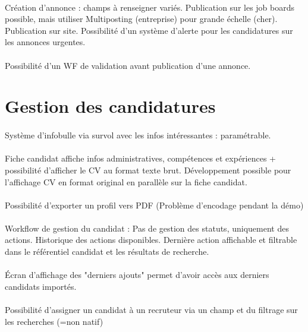 \paragraph{} Création d'annonce : champs à renseigner variés. Publication sur les job boards possible, mais utiliser Multiposting (entreprise) pour grande échelle (cher). Publication sur site. Possibilité d'un système d'alerte pour les candidatures sur les annonces urgentes.
\paragraph{} Possibilité d'un WF de validation avant publication d'une annonce.


\section{Gestion des candidatures}

\paragraph{} Système d'infobulle via survol avec les infos intéressantes : paramétrable.
\paragraph{} Fiche candidat affiche infos administratives, compétences et expériences + possibilité d'afficher le CV au format texte brut. Développement possible pour l'affichage CV en format original en parallèle sur la fiche candidat. 
\paragraph{} Possibilité d'exporter un profil vers PDF (Problème d'encodage pendant la démo)
\paragraph{} Workflow de gestion du candidat : Pas de gestion des statuts, uniquement des actions. Historique des actions disponibles. Dernière action affichable et filtrable dans le référentiel candidat et les résultats de recherche.
\paragraph{} Écran d'affichage des "derniers ajouts" permet d'avoir accès aux derniers candidats importés.
\paragraph{} Possibilité d'assigner un candidat à un recruteur via un champ et du filtrage sur les recherches (=non natif)



